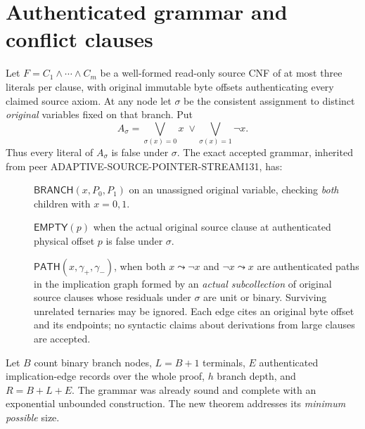 \documentclass[11pt]{article}
\begin{document}
\section{Authenticated grammar and conflict clauses}
Let \(F=C_1\wedge\cdots\wedge C_m\) be a well-formed read-only source CNF of at most three literals per clause, with original immutable byte offsets authenticating every claimed source axiom. At any node let \(\sigma\) be the consistent assignment to distinct \emph{original} variables fixed on that branch. Put
\[
A_\sigma=\bigvee_{\sigma(x)=0}x\;\vee\bigvee_{\sigma(x)=1}\neg x.
\]
Thus every literal of \(A_\sigma\) is false under \(\sigma\). The exact accepted grammar, inherited from peer ADAPTIVE-SOURCE-POINTER-STREAM131, has:
\begin{description}
\item[] \(\mathsf{BRANCH}(x,P_0,P_1)\) on an unassigned original variable, checking \emph{both} children with \(x=0,1\).
\item[] \(\mathsf{EMPTY}(p)\) when the actual original source clause at authenticated physical offset \(p\) is false under \(\sigma\).
\item[] \(\mathsf{PATH}(x,\gamma_+,\gamma_-)\), when both \(x\leadsto\neg x\) and \(\neg x\leadsto x\) are authenticated paths in the implication graph formed by an \emph{actual subcollection} of original source clauses whose residuals under \(\sigma\) are unit or binary. Surviving unrelated ternaries may be ignored. Each edge cites an original byte offset and its endpoints; no syntactic claims about derivations from large clauses are accepted.
\end{description}
Let \(B\) count binary branch nodes, \(L=B+1\) terminals, \(E\) authenticated implication-edge records over the whole proof, \(h\) branch depth, and \(R=B+L+E\). The grammar was already sound and complete with an exponential unbounded construction. The new theorem addresses its \emph{minimum possible} size.
\end{document}
